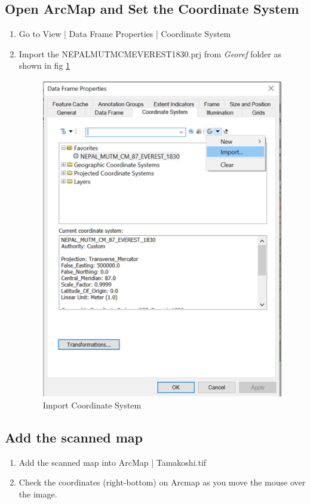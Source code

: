 \subsection{Open ArcMap and Set the Coordinate System}
\begin{enumerate}
\item{Go to View | Data Frame Properties | Coordinate System}
\item{Import the NEPAL\textunderscore MUTM\textunderscore CM\textunderscore EVEREST\textunderscore 1830.prj from \emph{Georef} folder as shown in fig \ref{coordinate_system} }
\begin{figure}[h]
\label{coordinate_system}
\centering
\includegraphics[scale=0.5]{images/coordinate_system}
\caption{Import Coordinate System}
\end{figure}
\end{enumerate}

\subsection{Add the scanned map} 
\begin{enumerate}
\item{Add the scanned map into ArcMap | Tamakoshi.tif}
\item{Check the coordinates (right-bottom) on Arcmap as you move the mouse over the image.}
\end{enumerate}


